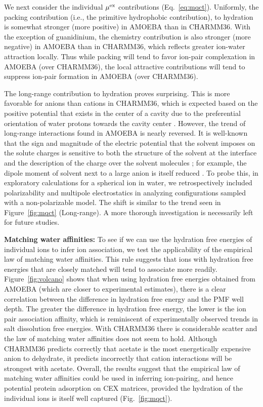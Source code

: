 \documentclass[journal=jpclcd,manuscript=article,articletitle=true,layout=twocolumn]{achemso}
\begin{document}
We next consider the individual $\mu^{\rm{ex}}$ contributions (Eq.~\ref{eq:mqct}). Uniformly, the packing contribution (i.e., the primitive hydrophobic contribution), to hydration is somewhat stronger (more positive) in AMOEBA than in CHARMM36. With the exception of guanidinium, the chemistry contribution is also stronger (more negative) in AMOEBA than in CHARMM36, which reflects greater ion-water attraction locally. Thus while packing will tend to favor ion-pair complexation in AMOEBA (over CHARMM36), the local attractive contributions will tend to suppress ion-pair formation in AMOEBA (over CHARMM36). 
  
The long-range contribution to hydration proves surprising. This is more favorable for anions than cations in CHARMM36, which is expected based on the positive potential that exists in the center of a cavity due to the preferential orientation of water protons towards the cavity center \cite{Hummer1996,Ashbaugh2000}. However, the trend of long-range interactions found in AMOEBA is nearly reversed. It is well-known that the sign and magnitude of the electric potential that the solvent imposes on the solute charges is sensitive to both the structure of the solvent at the interface and the description of the charge over the solvent molecules \cite{wilsonpratt:1988,doylebeck:2019}; for example, the dipole moment of solvent next to a large anion is itself reduced \cite{Guardia2009}. To probe this, in exploratory calculations for a spherical ion in water, we retrospectively included polarizability and multipole electrostatics in analyzing configurations sampled with a non-polarizable model. The shift is similar to the trend seen in Figure~\ref{fig:mqct} (Long-range). A more thorough investigation is necessarily left for future studies.  
 

\textbf{Matching water affinities:}  To see if we can use the hydration free energies of individual ions to infer ion association, we test the applicability of the empirical law of matching water affinities\cite{Collins1997, Collins2019}. This rule suggests that ions with hydration free energies that are closely matched will tend to associate more readily. Figure~\ref{fig:volcano} shows that when using hydration free energies obtained from AMOEBA (which are closer to experimental estimates), there is a clear correlation between the difference in hydration free energy and the PMF well depth. The greater the difference in hydration free energy, the lower is the ion pair association affinity, which is reminiscent of experimentally observed trends in salt dissolution free energies.\cite{Collins1997} With CHARMM36 there is considerable scatter and the law of matching water affinities does not seem to hold. Although CHARMM36 predicts correctly that acetate is the most energetically expensive anion to dehydrate, it predicts incorrectly that cation interactions will be strongest with acetate. Overall, the results suggest that the empirical law of matching water affinities could be used in inferring ion-pairing, and hence potential protein adsorption on CEX matrices, provided the hydration of the individual ions is itself well captured (Fig.~\ref{fig:mqct}).
\end{document}
